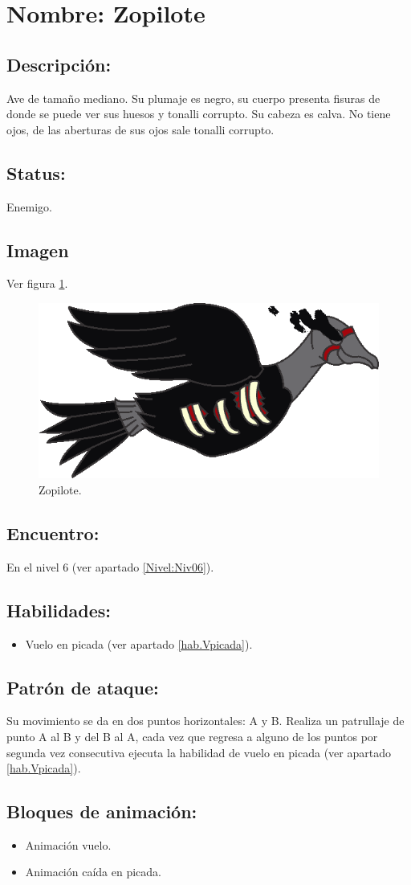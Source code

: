 \section{Nombre: Zopilote}   \label{per:zopilote}
\subsection{Descripción:}
Ave de tamaño mediano. Su plumaje es negro, su cuerpo presenta fisuras de donde se puede ver sus huesos y tonalli corrupto. Su cabeza es calva. No tiene ojos, de las aberturas de sus ojos sale tonalli corrupto. 
\subsection{Status:}
Enemigo.
\subsection{Imagen}
Ver figura \ref{fig:zopilote}.
\begin{figure}
	\centering
	\includegraphics[height=0.2 \textheight]{Imagenes/zopilote}
	\caption{Zopilote.}
	\label{fig:zopilote}
\end{figure}
\subsection{Encuentro:}
En el nivel 6 (ver apartado \ref{Nivel:Niv06}).
\subsection{Habilidades:}
\begin{itemize}
	\item Vuelo en picada (ver apartado \ref{hab.Vpicada}).
\end{itemize}
\subsection{Patrón de ataque:}
Su movimiento se da en dos puntos horizontales: A y B. Realiza un patrullaje de punto A al B y del B al A, cada vez que regresa a alguno de los puntos por segunda vez consecutiva ejecuta la habilidad de vuelo en picada (ver apartado \ref{hab.Vpicada}).
\subsection{Bloques de animación:}
\begin{itemize}
		\item Animación vuelo.
		\item Animación caída en picada.
	\end{itemize}
